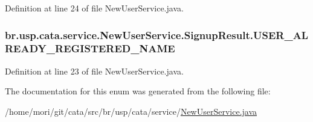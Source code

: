 Definition at line 24 of file New\+User\+Service.\+java.

\hypertarget{enumbr_1_1usp_1_1cata_1_1service_1_1_new_user_service_1_1_signup_result_a4c2e71e31093349767e83f8b365e0afb}{
\subsubsection[{U\+S\+E\+R\+\_\+\+A\+L\+R\+E\+A\+D\+Y\+\_\+\+R\+E\+G\+I\+S\+T\+E\+R\+E\+D\+\_\+\+N\+A\+M\+E}]{\setlength{\rightskip}{0pt plus 5cm}br.\+usp.\+cata.\+service.\+New\+User\+Service.\+Signup\+Result.\+U\+S\+E\+R\+\_\+\+A\+L\+R\+E\+A\+D\+Y\+\_\+\+R\+E\+G\+I\+S\+T\+E\+R\+E\+D\+\_\+\+N\+A\+M\+E}}\label{enumbr_1_1usp_1_1cata_1_1service_1_1_new_user_service_1_1_signup_result_a4c2e71e31093349767e83f8b365e0afb}


Definition at line 23 of file New\+User\+Service.\+java.



The documentation for this enum was generated from the following file\+:\begin{DoxyCompactItemize}
\item 
/home/mori/git/cata/src/br/usp/cata/service/\hyperlink{_new_user_service_8java}{New\+User\+Service.\+java}\end{DoxyCompactItemize}
